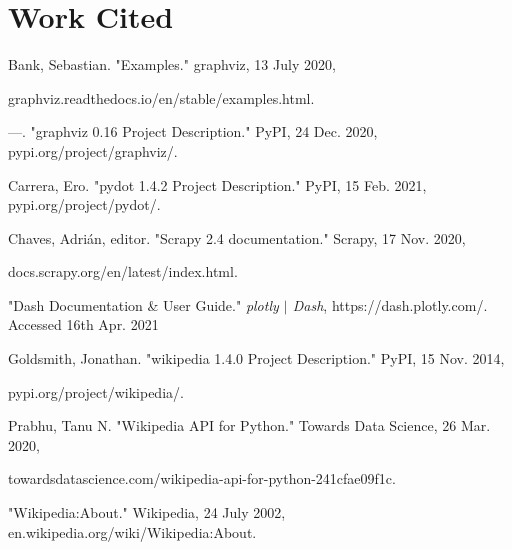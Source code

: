 \documentclass[fontsize=11pt]{article}
\begin{document}
\section*{Work Cited}
\begin{flushleft}  
  
Bank, Sebastian. "Examples." graphviz, 13 July 2020, 
  
\smallskip  

\qquad graphviz.readthedocs.io/en/stable/examples.html.
  
\vspace{0.3 cm}  
  

---. "graphviz 0.16 Project Description." PyPI, 24 Dec. 2020, pypi.org/project/graphviz/. 

\vspace{0.3 cm}

Carrera, Ero. "pydot 1.4.2 Project Description." PyPI, 15 Feb. 2021, pypi.org/project/pydot/. 

\vspace{0.3 cm}

Chaves, Adrián, editor. "Scrapy 2.4 documentation." Scrapy, 17 Nov. 2020,

\smallskip

\qquad docs.scrapy.org/en/latest/index.html.

\vspace{0.3 cm}

"Dash Documentation \& User Guide." \textit{plotly $|$  Dash}, https://dash.plotly.com/. Accessed 16th Apr. 2021

\vspace{0.3 cm}

Goldsmith, Jonathan. "wikipedia 1.4.0 Project Description." PyPI, 15 Nov. 2014,

\smallskip

\qquad pypi.org/project/wikipedia/.

\vspace{0.3 cm}

Prabhu, Tanu N. "Wikipedia API for Python." Towards Data Science, 26 Mar. 2020,

\smallskip

\qquad towardsdatascience.com/wikipedia-api-for-python-241cfae09f1c.

\vspace{0.3 cm}

"Wikipedia:About." Wikipedia, 24 July 2002, en.wikipedia.org/wiki/Wikipedia:About.


\end{flushleft}  
\end{document}

